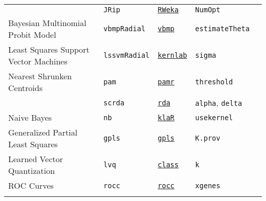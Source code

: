 \documentclass[12pt]{article}
\begin{document}
\begin{landscape}
\begin{longtable}{lllll}
\rowcolor[rgb]{.95, .95, .95}               
        &
         \texttt{JRip} & 
           {\tt \href{http://cran.r-project.org/web/packages/RWeka/index.html}{RWeka}}    & 
            \texttt{NumOpt}   & \\

              
      Bayesian Multinomial Probit Model  
      & \texttt{vbmpRadial} 
      &  {\tt \href{http://cran.r-project.org/web/packages/vbmp/index.html}{vbmp}} 
      & \texttt{estimateTheta} & \\

\rowcolor[rgb]{.95, .95, .95}            
      Least Squares Support Vector Machines &
         \texttt{lssvmRadial} & 
             {\tt \href{http://cran.r-project.org/web/packages/kernlab/index.html}{kernlab}}      & 
            \texttt{sigma} & \\             
       
      
      Nearest Shrunken Centroids&
         \texttt{pam} & 
             {\tt \href{http://cran.r-project.org/web/packages/pamr/index.html}{pamr}}        & 
            \texttt{threshold} & \\  

&
         \texttt{scrda} & 
             {\tt \href{http://cran.r-project.org/web/packages/rda/index.html}{rda}}        & 
            \texttt{alpha}, \texttt{delta} & \\              
       
\rowcolor[rgb]{.95, .95, .95}                  
      Naive Bayes &
         \texttt{nb} & 
            {\tt \href{http://cran.r-project.org/web/packages/klaR/index.html}{klaR}}     & 
            \texttt{usekernel} & \\
        
      Generalized Partial Least Squares&
         \texttt{gpls} & 
             {\tt \href{http://cran.r-project.org/web/packages/gpls/index.html}{gpls}}      & 
            \texttt{K.prov} & \\
            
\rowcolor[rgb]{.95, .95, .95}            
      Learned Vector  Quantization&
         \texttt{lvq} & 
             {\tt \href{http://cran.r-project.org/web/packages/class/index.html}{class}}       &          
            \texttt{k} & \\  
     
            
      ROC Curves &
         \texttt{rocc} & 
             {\tt \href{http://cran.r-project.org/web/packages/rocc/index.html}{rocc}}    &          
            \texttt{xgenes} & \\                 
\label{label-name}
\end{longtable}
\end{landscape}
\pagestyle{fancy}
\end{document}
